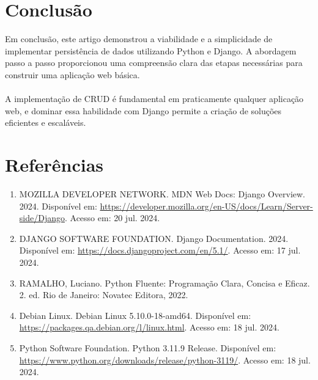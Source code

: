 \documentclass[11pt]{article} %
\begin{document}
\maketitle
\section{Conclusão}
Em conclusão, este artigo demonstrou a viabilidade e a simplicidade de implementar persistência de dados utilizando Python e Django. A abordagem passo a passo proporcionou uma compreensão clara das etapas necessárias para construir uma aplicação web básica.\\\\
A implementação de CRUD é fundamental em praticamente qualquer aplicação web, e dominar essa habilidade com Django permite a criação de soluções eficientes e escaláveis.


\section{Referências}
\begin{enumerate}
    \item MOZILLA DEVELOPER NETWORK. MDN Web Docs: Django Overview. 2024. Disponível em: \url{https://developer.mozilla.org/en-US/docs/Learn/Server-side/Django}. Acesso em: 20 jul. 2024.
    \item DJANGO SOFTWARE FOUNDATION. Django Documentation. 2024. Disponível em: \url{https://docs.djangoproject.com/en/5.1/}. Acesso em: 17 jul. 2024.
    \item RAMALHO, Luciano. Python Fluente: Programação Clara, Concisa e Eficaz. 2. ed. Rio de Janeiro: Novatec Editora, 2022.
    \item Debian Linux. Debian Linux 5.10.0-18-amd64. Disponível em: \url{https://packages.qa.debian.org/l/linux.html}. Acesso em: 18 jul. 2024.
    \item Python Software Foundation. Python 3.11.9 Release. Disponível em: \url{https://www.python.org/downloads/release/python-3119/}. Acesso em: 18 jul. 2024.
\end{enumerate}
\end{document}
